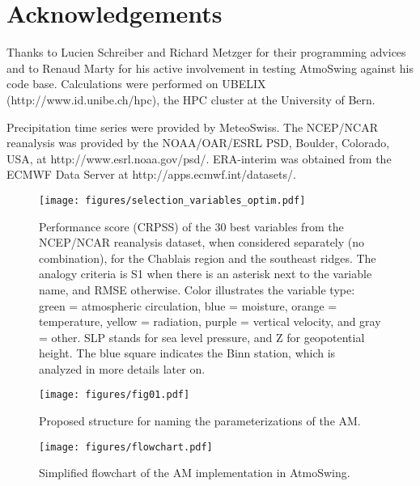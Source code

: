 \documentclass[review]{elsarticle}
\begin{document}
\section*{Acknowledgements}
Thanks to Lucien Schreiber and Richard Metzger for their programming advices and to Renaud Marty for his active involvement in testing AtmoSwing against his code base. Calculations were performed on UBELIX (http://www.id.unibe.ch/hpc), the HPC cluster at the University of Bern. 

Precipitation time series were provided by MeteoSwiss. The NCEP/NCAR reanalysis was provided by the NOAA/OAR/ESRL PSD, Boulder, Colorado, USA, at http://www.esrl.noaa.gov/psd/. ERA-interim was obtained from the ECMWF Data Server at http://apps.ecmwf.int/datasets/. 





\clearpage


\begin{figure*}[t]
	\texttt{[image: figures/selection\_variables\_optim.pdf]}
	\caption{Performance score (CRPSS) of the 30 best variables from the NCEP/NCAR reanalysis dataset, when considered separately (no combination), for the Chablais region and the southeast ridges. The analogy criteria is S1 when there is an asterisk next to the variable name, and RMSE otherwise. Color illustrates the variable type: green = atmospheric circulation, blue = moisture, orange = temperature, yellow = radiation, purple = vertical velocity, and gray = other. SLP stands for sea level pressure, and Z for geopotential height. The blue square indicates the Binn station, which is analyzed in more details later on.}
	\label{figure:variable_exploration}
\end{figure*}

\begin{figure}[t]
	\texttt{[image: figures/fig01.pdf]}
	\caption{Proposed structure for naming the parameterizations of the AM.}
	\label{figure:nomenclature}
\end{figure}

\begin{figure}[t]
	\texttt{[image: figures/flowchart.pdf]}
	\caption{Simplified flowchart of the AM implementation in AtmoSwing.}
	\label{figure:flowchart_modules_atmoswing}
\end{figure}
\end{document}
